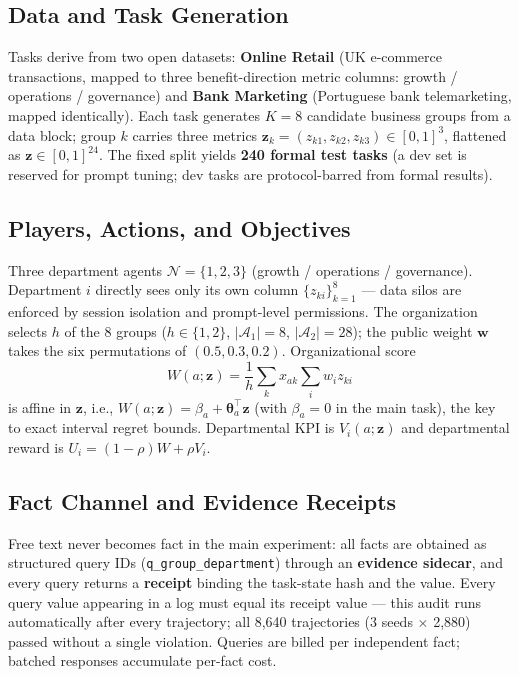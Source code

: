 \documentclass[letterpaper]{article}
\begin{document}
\subsection{Data and Task Generation}
Tasks derive from two open datasets: \textbf{Online Retail} (UK e-commerce transactions, mapped to three benefit-direction metric columns: growth / operations / governance) and \textbf{Bank Marketing} (Portuguese bank telemarketing, mapped identically). Each task generates $K{=}8$ candidate business groups from a data block; group $k$ carries three metrics $\boldsymbol z_k=(z_{k1},z_{k2},z_{k3})\in[0,1]^3$, flattened as $\boldsymbol z\in[0,1]^{24}$. The fixed split yields \textbf{240 formal test tasks} (a dev set is reserved for prompt tuning; dev tasks are protocol-barred from formal results).

\subsection{Players, Actions, and Objectives}
Three department agents $\mathcal N=\{1,2,3\}$ (growth / operations / governance). Department $i$ directly sees only its own column $\{z_{ki}\}_{k=1}^8$ --- data silos are enforced by session isolation and prompt-level permissions. The organization selects $h$ of the 8 groups ($h\in\{1,2\}$, $|\mathcal A_1|=8$, $|\mathcal A_2|=28$); the public weight $\boldsymbol w$ takes the six permutations of $(0.5,0.3,0.2)$. Organizational score
\begin{equation}
W(a;\boldsymbol z)=\frac{1}{h}\sum_{k} x_{ak}\sum_i w_i z_{ki}
\end{equation}
is affine in $\boldsymbol z$, i.e., $W(a;\boldsymbol z)=\beta_a+\boldsymbol\theta_a^\top\boldsymbol z$ (with $\beta_a=0$ in the main task), the key to exact interval regret bounds. Departmental KPI is $V_i(a;\boldsymbol z)$ and departmental reward is $U_i=(1-\rho)W+\rho V_i$.

\subsection{Fact Channel and Evidence Receipts}
Free text never becomes fact in the main experiment: all facts are obtained as structured query IDs (\texttt{q\_group\_department}) through an \textbf{evidence sidecar}, and every query returns a \textbf{receipt} binding the task-state hash and the value. Every query value appearing in a log must equal its receipt value --- this audit runs automatically after every trajectory; all 8,640 trajectories (3 seeds $\times$ 2,880) passed without a single violation. Queries are billed per independent fact; batched responses accumulate per-fact cost.
\end{document}

